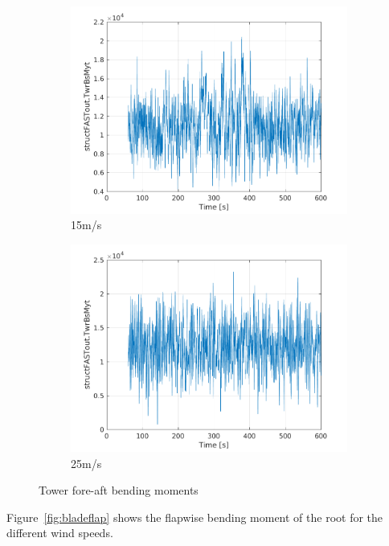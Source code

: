 \documentclass[10pt]{article}
\begin{document}
\begin{figure}[H]
\begin{subfigure}{0.40\textwidth}
  \includegraphics[width=1\linewidth]{../CIP_6/FAST/Plots_ws15/TwrBsMyt.png}
  \caption{15m/s}
\end{subfigure}
\begin{subfigure}{0.40\textwidth}
  \includegraphics[width=1\linewidth]{../CIP_6/FAST/Plots_ws25/TwrBsMyt.png}
  \caption{25m/s}
\end{subfigure}
\caption{Tower fore-aft bending moments}
\label{fig:towerforeaft}
\end{figure}

Figure~\ref{fig:bladeflap} shows the flapwise bending moment of the root for the different wind speeds.
\end{document}
